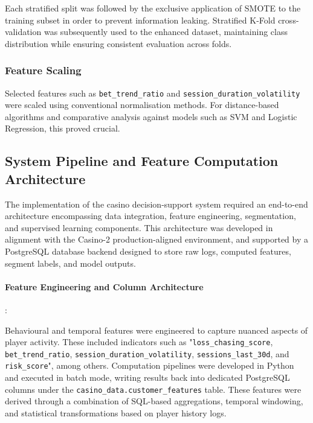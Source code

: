 \documentclass[12pt,a4paper]{report}
\begin{document}
Each stratified split was followed by the exclusive application of SMOTE to the training subset in order to prevent information leaking. Stratified K-Fold cross-validation was subsequently used to the enhanced dataset, maintaining class distribution while ensuring consistent evaluation across folds.


\subsubsection*{Feature Scaling}

Selected features such as \texttt{bet\_trend\_ratio} and \texttt{session\_duration\_volatility} were scaled using conventional normalisation methods. For distance-based algorithms and comparative analysis against models such as SVM and Logistic Regression, this proved crucial.


\subsection{System Pipeline and Feature Computation Architecture}
\label{sec:system_pipeline_feature_architecture}

The implementation of the casino decision-support system required an end-to-end architecture encompassing data integration, feature engineering, segmentation, and supervised learning components. This architecture was developed in alignment with the Casino-2 production-aligned environment, and supported by a PostgreSQL database backend designed to store raw logs, computed features, segment labels, and model outputs.

\paragraph{Feature Engineering and Column Architecture}:

Behavioural and temporal features were engineered to capture nuanced aspects of player activity. These included indicators such as "\texttt{loss\_chasing\_score}, \texttt{bet\_trend\_ratio}, \texttt{session\_duration\_volatility}, \texttt{sessions\_last\_30d}, and \texttt{risk\_score}", among others. Computation pipelines were developed in Python and executed in batch mode, writing results back into dedicated PostgreSQL columns under the \texttt{casino\_data.customer\_features} table. These features were derived through a combination of SQL-based aggregations, temporal windowing, and statistical transformations based on player history logs.
\end{document}
